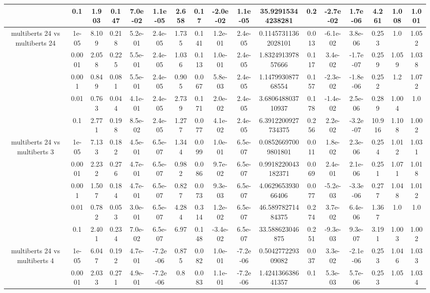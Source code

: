 \begin{tabular}{|c|c|c|c|c|c|c|c|c|c|c|c|c|c|c|c|c|}
 & 0.1 & 1.903 & 0.147 & 7.0e-02 & 1.1e-05 & 2.658 & 0.17 & -2.0e-02 & 1.1e-05 & 35.92915344238281 & 0.2 & -2.7e-02 & 1.7e-06 & 4.261 & 1.008 & 1.001 \\
\hline
\multirow{5}{*}{multiberts 24 vs multiberts 24} & 1e-05 & 8.109 & 0.218 & 5.2e-01 & 2.4e-05 & 1.735 & 0.141 & 1.2e-01 & 2.4e-05 & 0.11457311362028101 & 0.013 & -6.1e-02 & 3.8e-06 & 0.253 & 1.0 & 1.052 \\
 & 0.0001 & 2.058 & 0.225 & 5.5e-01 & 2.4e-05 & 1.036 & 0.113 & 1.0e-01 & 2.4e-05 & 1.832491397857666 & 0.117 & 3.4e-02 & -1.7e-07 & 0.259 & 1.059 & 1.038 \\
 & 0.001 & 0.849 & 0.081 & 5.5e-01 & 2.4e-05 & 0.905 & 0.067 & 5.8e-03 & 2.4e-05 & 1.147993087768554 & 0.157 & -2.3e-02 & -1.8e-06 & 0.252 & 1.2 & 1.072 \\
 & 0.01 & 0.763 & 0.044 & 4.1e-01 & 2.4e-05 & 2.739 & 0.171 & 2.0e-02 & 2.4e-05 & 3.680648803710937 & 0.178 & -1.4e-02 & 2.5e-06 & 0.289 & 1.004 & 1.0 \\
 & 0.1 & 2.771 & 0.198 & 8.5e-02 & 2.4e-05 & 1.277 & 0.077 & 4.1e-02 & 2.4e-05 & 6.3912200927734375 & 0.256 & 2.2e-02 & -3.2e-07 & 10.916 & 1.108 & 1.002 \\
\hline
\multirow{5}{*}{multiberts 24 vs multiberts 3} & 1e-05 & 7.133 & 0.182 & 4.5e-01 & 6.5e-07 & 1.344 & 0.099 & 1.0e-01 & 6.5e-07 & 0.08526697009801801 & 0.011 & 1.8e-02 & 2.3e-06 & 0.254 & 1.012 & 1.031 \\
 & 0.0001 & 2.232 & 0.276 & 4.7e-01 & 6.5e-07 & 0.982 & 0.086 & 9.7e-02 & 6.5e-07 & 0.9918220043182371 & 0.069 & 2.4e-01 & 2.1e-06 & 0.251 & 1.071 & 1.018 \\
 & 0.001 & 1.507 & 0.184 & 4.7e-01 & 6.5e-07 & 0.827 & 0.073 & 9.3e-03 & 6.5e-07 & 4.062965393066406 & 0.077 & -5.2e-03 & -3.3e-06 & 0.277 & 1.048 & 1.012 \\
 & 0.01 & 0.782 & 0.053 & 3.0e-01 & 6.5e-07 & 4.284 & 0.314 & 1.2e-02 & 6.5e-07 & 46.58978271484375 & 0.274 & 3.7e-02 & 6.4e-06 & 1.367 & 1.0 & 1.0 \\
 & 0.1 & 2.401 & 0.234 & 7.0e-02 & 6.5e-07 & 6.97 & 0.148 & -3.4e-02 & 6.5e-07 & 33.588623046875 & 0.251 & -9.3e-03 & 9.3e-07 & 3.191 & 1.003 & 1.002 \\
\hline
\multirow{5}{*}{multiberts 24 vs multiberts 4} & 1e-05 & 6.047 & 0.192 & 4.7e-01 & -7.2e-06 & 0.875 & 0.082 & 1.0e-01 & -7.2e-06 & 0.504277229309082 & 0.037 & 3.3e-02 & -2.1e-06 & 0.253 & 1.046 & 1.033 \\
 & 0.0001 & 2.033 & 0.271 & 4.9e-01 & -7.2e-06 & 0.8 & 0.083 & 1.1e-01 & -7.2e-06 & 1.424136638641357 & 0.1 & 5.3e-03 & 5.7e-06 & 0.253 & 1.05 & 1.034 \\

\end{tabular}
